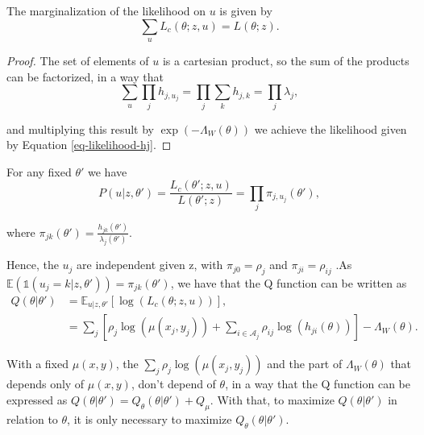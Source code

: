 \begin{lemma}
  \label{lem-marginalization-likelihood}
  The marginalization of the likelihood on $u$ is given by
  \begin{equation*}
    \sum_{u}L_{c}(\theta;z,u) = L(\theta;z).
  \end{equation*}
\end{lemma}

\begin{proof}
  The set of elements of $u$ is a cartesian product, so the sum of the products can be factorized, in a way that
  \begin{equation*}
    \sum_{u}\prod_{j}h_{j,u_{j}} = \prod_{j}\sum_{k}h_{j,k} = \prod_{j}\lambda_{j},
  \end{equation*}

  \noindent and multiplying this result by $\exp\left(- \Lambda_{W}(\theta)\right)$ we achieve the likelihood given by Equation \eqref{eq-likelihood-hj}.
\end{proof}

\begin{lemma}
  \label{lem-prob-u}
  For any fixed $\theta'$ we have
  \begin{equation*}
    P(u|z,\theta') = \frac{L_{c}(\theta';z,u)}{L(\theta';z)} = \prod_{j}\pi_{j,u_{j}}(\theta'),
  \end{equation*}

  \noindent where $\pi_{jk}(\theta') = \frac{h_{jk}(\theta')}{\lambda_{j}(\theta')}$.
\end{lemma}

Hence, the $u_{j}$ are independent given z, with $\pi_{j0} = \rho_{j}$ and $\pi_{ji} = \rho_{ij}$ .As $\mathds{E}(\mathds{1}(u_{j} = k|z,\theta')) = \pi_{jk}(\theta')$, we have that the Q function can be written as
\begin{align*}
  Q(\theta|\theta') &= \mathds{E}_{u|z,\theta'}\left[\log(L_{c}(\theta;z,u))\right], \\
                    &= \sum_{j}\left[\rho_{j}\log\left(\mu(x_{j},y_{j})\right) + \sum_{i \in \mathcal{A}_{j}}\rho_{ij}\log(h_{ji}(\theta))\right] - \Lambda_{W}(\theta).
\end{align*}

With a fixed $\mu(x,y)$, the $\sum_{j}\rho_{j}\log(\mu(x_{j},y_{j}))$ and the part of $\Lambda_{W}(\theta)$ that depends only of $\mu(x,y)$, don't depend of $\theta$, in a way that the Q function can be expressed as $Q(\theta|\theta') = Q_{\theta}(\theta|\theta') + Q_{\mu}$. With that, to maximize $Q(\theta|\theta')$ in relation to $\theta$, it is only necessary to maximize $Q_{\theta}(\theta|\theta')$.

